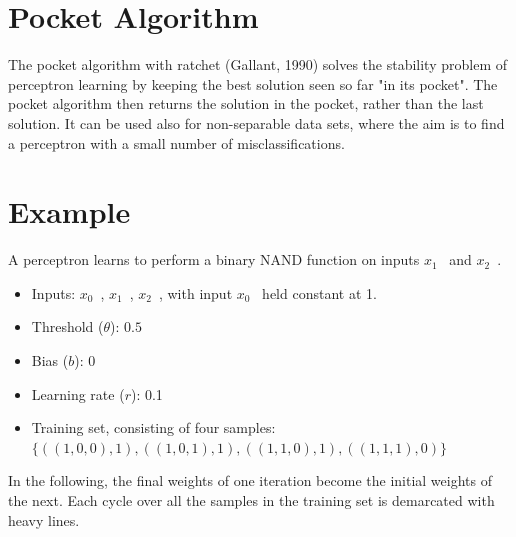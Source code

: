 \documentclass[12pt, right open]{memoir}
\makeatletter
\newcommand{\specialcell}[2][c]
{
  \begin{tabular}[#1]{@{}c@{}}#2\end{tabular}
}
\makeatother
\begin{document}
\section{Pocket Algorithm}
The pocket algorithm with ratchet (Gallant, 1990) solves the stability problem of perceptron learning by keeping the best solution seen so far "in its pocket". The pocket algorithm then returns the solution in the pocket, rather than the last solution. It can be used also for non-separable data sets, where the aim is to find a perceptron with a small number of misclassifications.


\section{Example}
A perceptron learns to perform a binary NAND function on inputs $x_1$ \, and $x_2$ \,.

\begin{itemize}
\item Inputs: $x_0$ \,, $x_1$ \,, $x_2$ \,, with input $x_0$ \, held constant at 1.
\item Threshold ($\theta$): $0.5$
\item Bias ($b$): 0
\item Learning rate ($r$): 0.1
\item Training set, consisting of four samples: $\{((1, 0, 0), 1), ((1, 0, 1), 1), ((1, 1, 0), 1), ((1, 1, 1), 0)\}$ \,
\end{itemize}


In the following, the final weights of one iteration become the initial weights of the next. Each cycle over all the samples in the training set is demarcated with heavy lines.


%
%
%
%
\end{document}
